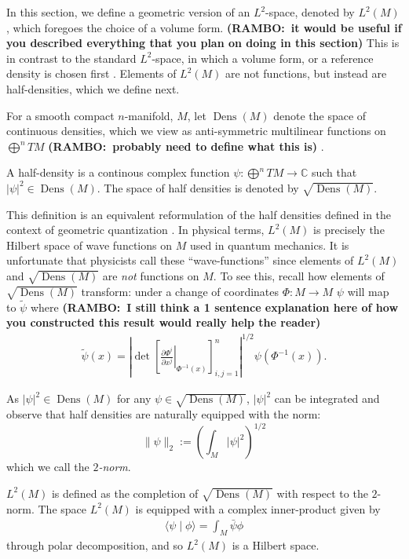 \documentclass[final,leqno]{siamltex1213}
\newcommand{\ram}[1]{{\normalsize{\textbf{({\color{red}RAMBO:\ }#1)}}}}
\newcommand{\pder}[2]{\ensuremath{\frac{ \partial #1}{\partial #2}}}
\DeclareMathOperator{\Dens}{Dens}
\begin{document}
In this section, we define a geometric version of an $L^{2}$-space, denoted by $L^{2}(M)$, which foregoes the choice of a volume form. \ram{it would be useful if you described everything that you plan on doing in this section}
This is in contrast to the standard $L^{2}$-space, in which a volume form, or a reference density is chosen first \cite{Adams2003}.
Elements of $L^{2}(M)$ are not functions, but instead are half-densities, which we define next.

For a smooth compact $n$-manifold, $M$, let $\Dens(M)$ denote the space of continuous densities, which we view as anti-symmetric multilinear functions on $\bigoplus^n TM$ \ram{probably need to define what this is} \cite[Chapter 16]{Lee2006}.
\begin{definition}\label{def:half density}
	A half-density is a continous complex function $\psi : \bigoplus^n TM \to \mathbb{C}$
	such that $| \psi |^{2} \in \Dens(M)$.
	The space of half densities is denoted by $\sqrt{\Dens(M)}$.
\end{definition}

This definition is an equivalent reformulation of the half densities defined in the context of geometric quantization \cite{GuilleminSternberg1970,BatesWeinstein1997}.
In physical terms, $L^{2}(M)$ is precisely the Hilbert space of wave functions on $M$ used in quantum mechanics.
It is unfortunate that physicists call these ``wave-functions'' since elements of $L^{2}(M)$ and $\sqrt{\Dens(M)}$ are \emph{not} functions on $M$.
To see this, recall how elements of $\sqrt{\Dens(M)}$ transform:
under a change of coordinates $\Phi: M \to M$ $\psi$ will map to $\tilde \psi$ where \ram{I still think a 1 sentence explanation here of how you constructed this result would really help the reader}
\begin{align}
	\tilde{\psi}(x)  =  \left| \det \left[ \left. \pder{\Phi^{i}}{x^{j}} \right|_{\Phi^{-1}(x)} \right]_{i,j=1}^{n} \right|^{1/2} \psi( \Phi^{-1}(x) ). \label{eq:transformation law}
\end{align}


As $|\psi|^{2} \in \Dens(M)$ for any $\psi \in \sqrt{\Dens(M)}$, $|\psi|^{2}$ can be integrated and observe that half densities are naturally equipped with the norm: $$\| \psi \|_2 :=  \left( \int_M |\psi|^2 \right)^{1/2}$$ which we call the \emph{$2$-norm}.
\begin{definition}
	$L^{2}(M)$ is defined as the completion of $\sqrt{ \Dens(M)}$ with respect to the $2$-norm.
	The space $L^{2}(M)$ is equipped with a complex inner-product given by
	\begin{align}
		\langle \psi \mid \phi \rangle = \int_{M} \bar \psi \phi
	\end{align}
	through polar decomposition, and so $L^{2}(M)$ is a Hilbert space.
\end{definition}
\end{document}
